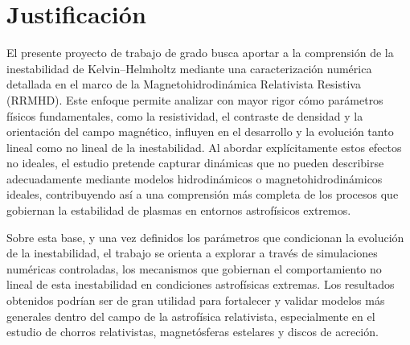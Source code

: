 \section{Justificación}
El presente proyecto de trabajo de grado busca aportar a la comprensión de la inestabilidad de Kelvin–Helmholtz mediante una caracterización numérica detallada en el marco de la Magnetohidrodinámica Relativista Resistiva (RRMHD). Este enfoque permite analizar con mayor rigor cómo parámetros físicos fundamentales, como la resistividad, el contraste de densidad y la orientación del campo magnético, influyen en el desarrollo y la evolución tanto lineal como no lineal de la inestabilidad. Al abordar explícitamente estos efectos no ideales, el estudio pretende capturar dinámicas que no pueden describirse adecuadamente mediante modelos hidrodinámicos o magnetohidrodinámicos ideales, contribuyendo así a una comprensión más completa de los procesos que gobiernan la estabilidad de plasmas en entornos astrofísicos extremos.

Sobre esta base, y una vez definidos los parámetros que condicionan la evolución de la inestabilidad, el trabajo se orienta a explorar a  través de simulaciones numéricas controladas, los mecanismos que gobiernan el comportamiento no lineal de esta inestabilidad en condiciones astrofísicas extremas. Los resultados obtenidos podrían ser de gran utilidad para fortalecer y validar modelos más generales dentro del campo de la astrofísica relativista, especialmente en el estudio de chorros relativistas, magnetósferas estelares y discos de acreción.
